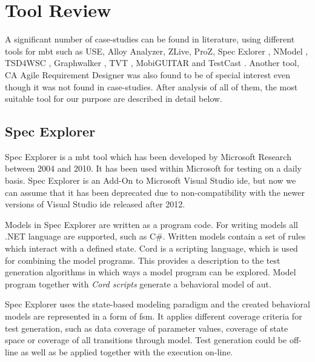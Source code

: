 \section{Tool Review}

\par
A significant number of case-studies can be found in literature, using different tools for \acrshort{mbt} such as USE\cite{USE_definition}, Alloy Analyzer\cite{USE_definition}, ZLive\cite{USE_definition}, ProZ\cite{USE_definition}, Spec Exlorer \cite{SpecExplorer_Description}, NModel \cite{NModel_Description} \cite{NModel_Description2}, TSD4WSC \cite{TSD4WSC}, Graphwalker \cite{Graphwalker_Description}, TVT \cite{TVT}, MobiGUITAR \cite{MobiGUITAR} and TestCast \cite{testcast}. Another tool, CA Agile Requirement Designer \cite{Agile_Requirement_Designer_desciption} was also found to be of special interest even though it was not found in case-studies. After analysis of all of them, the most suitable tool for our purpose are described in detail  below.

\subsection{Spec Explorer}
\par
Spec Explorer is a \acrshort{mbt} tool which has been developed by Microsoft Research between 2004 and 2010. It has been used within Microsoft for testing on a daily basis. Spec Explorer is an Add-On to Microsoft Visual Studio \acrshort{ide}, but now we can assume that it has been deprecated due to non-compatibility with the newer versions of Visual Studio \acrshort{ide} released after 2012.
\par
Models in Spec Explorer are written as a program code. For writing models all .NET language are supported, such as C\#. Written models contain a set of rules which interact with a defined state. Cord is a scripting language, which is used for combining the model programs. This provides a description to the test generation algorithms in which ways a model program can be explored. Model program together with \textit{Cord scripts} generate a behavioral model of \acrlong{aut}.

\par
Spec Explorer uses the state-based modeling paradigm and the created behavioral models are represented in a form of \acrshort{fsm}. It applies different coverage criteria for test generation, such as data coverage of parameter values, coverage of state space or coverage of all transitions through model. Test generation could be off-line as well as be applied together with the execution on-line.

